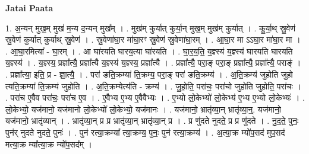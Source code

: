 \documentclass[17pt]{extarticle}
\begin{document}
\textbf{Jatai Paata} \newline

1. अ॒न्यन् मुख॒म् मुख॑ म॒न्य द॒न्यन् मुख᳚म् । . मुख॑म् कुर्यात् कुर्या॒न् मुख॒म् मुख॑म् कुर्यात् । . कु॒र्या॒थ् स्रु॒वेण॑ स्रु॒वेण॑ कुर्यात् कुर्याथ् स्रु॒वेण॑ । . स्रु॒वेणा॑घा॒र मा॑घा॒रꣳ स्रु॒वेण॑ स्रु॒वेणा॑घा॒रम् । . आ॒घा॒र मा ऽऽघा॒र मा॑घा॒र मा । . आ॒घा॒रमित्या᳚ - घा॒रम् । . आ घा॑रयति घारय॒त्या घा॑रयति । . घा॒र॒य॒ति॒ य॒ज्ञ्स्य॑ य॒ज्ञ्स्य॑ घारयति घारयति य॒ज्ञ्स्य॑ । . य॒ज्ञ्स्य॒ प्रज्ञा᳚त्यै॒ प्रज्ञा᳚त्यै य॒ज्ञ्स्य॑ य॒ज्ञ्स्य॒ प्रज्ञा᳚त्यै । . प्रज्ञा᳚त्यै॒ परा॒ङ् परा॒ङ् प्रज्ञा᳚त्यै॒ प्रज्ञा᳚त्यै॒ पराङ्॑ । . प्रज्ञा᳚त्या॒ इति॒ प्र - ज्ञा॒त्यै॒ । . परा॑ ङति॒क्रम्या॑ ति॒क्रम्य॒ परा॒ङ् परा॑ ङति॒क्रम्य॑ । . अ॒ति॒क्रम्य॑ जुहोति जुहो त्यति॒क्रम्या॑ ति॒क्रम्य॑ जुहोति । . अ॒ति॒क्रम्येत्य॑ति - क्रम्य॑ । . जु॒हो॒ति॒ परा॑चः॒ परा॑चो जुहोति जुहोति॒ परा॑चः । . परा॑च ए॒वैव परा॑चः॒ परा॑च ए॒व । . ए॒वैभ्य ए॒भ्य ए॒वैवैभ्यः । . ए॒भ्यो लो॒केभ्यो॑ लो॒केभ्य॑ ए॒भ्य ए॒भ्यो लो॒केभ्यः॑ । . लो॒केभ्यो॒ यज॑मानो॒ यज॑मानो लो॒केभ्यो॑ लो॒केभ्यो॒ यज॑मानः । . यज॑मानो॒ भ्रातृ॑व्या॒न् भ्रातृ॑व्या॒न्॒. यज॑मानो॒ यज॑मानो॒ भ्रातृ॑व्यान् । . भ्रातृ॑व्या॒न् प्र प्र भ्रातृ॑व्या॒न् भ्रातृ॑व्या॒न् प्र । . प्र णु॑दते नुदते॒ प्र प्र णु॑दते । . नु॒द॒ते॒ पुनः॒ पुन॑र् नुदते नुदते॒ पुनः॑ । . पुन॑ रत्या॒क्रम्या᳚ त्या॒क्रम्य॒ पुनः॒ पुन॑ रत्या॒क्रम्य॑ । . अ॒त्या॒क्र म्यो॑प॒सद॑ मुप॒सद॑ मत्या॒क्र म्या᳚त्या॒क्र म्यो॑प॒सद᳚म् । \newline
\end{document}
